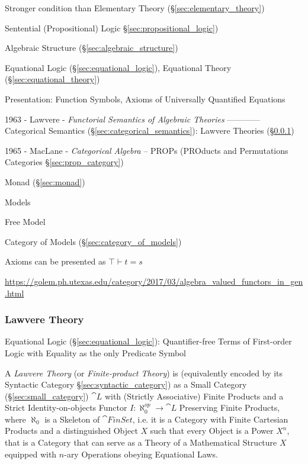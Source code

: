 Stronger condition than Elementary Theory (\S\ref{sec:elementary_theory})

Sentential (Propositional) Logic \S\ref{sec:propositional_logic})

Algebraic Structure (\S\ref{sec:algebraic_structure})

Equational Logic (\S\ref{sec:equational_logic}),
Equational Theory (\S\ref{sec:equational_theory})

Presentation: Function Symbols, Axioms of Universally Quantified Equations

1963 - Lawvere - \emph{Functorial Semantics of Algebraic Theories} ------------
Categorical Semantics (\S\ref{sec:categorical_semantics}): Lawvere Theories
(\S\ref{sec:lawvere_theory})

1965 - MacLane - \emph{Categorical Algebra} -- PROPs (PROducts and Permutations
Categories \S\ref{sec:prop_category})

Monad (\S\ref{sec:monad})

Models

Free Model

Category of Models (\S\ref{sec:category_of_models})

Axioms can be presented as $\top \vdash t = s$


\url{https://golem.ph.utexas.edu/category/2017/03/algebra_valued_functors_in_gen.html}



\subsubsection{Lawvere Theory}\label{sec:lawvere_theory}

\fist Equational Logic (\S\ref{sec:equational_logic}): Quantifier-free Terms of
First-order Logic with Equality as the only Predicate Symbol

A \emph{Lawvere Theory} (or \emph{Finite-product Theory}) is (equivalently
encoded by its Syntactic Category \S\ref{sec:syntactic_category}) as a Small
Category (\S\ref{sec:small_category}) $\cat{L}$ with (Strictly Associative)
Finite Products and a Strict Identity-on-objects Functor $I : \aleph_0^{op}
\rightarrow \cat{L}$ Preserving Finite Products, where $\aleph_0$ is a Skeleton
of $\cat{FinSet}$, i.e. it is a Category with Finite Cartesian Products and a
distinguished Object $X$ such that every Object is a Power $X^n$, that is a
Category that can serve as a Theory of a Mathematical Structure $X$ equipped
with $n$-ary Operations obeying Equational Laws.

